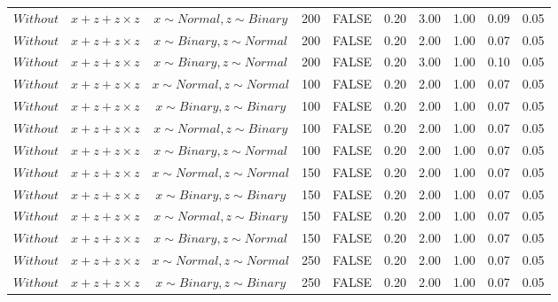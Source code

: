 \begin{longtable}{lccccccccc}
  $Without$ & $\textit{x} + \textit{z} + \textit{z} \times \textit{z}$ & $\textit{x} \sim Normal, \textit{z} \sim Binary$ & 200 & FALSE & 0.20 & 3.00 & 1.00 & 0.09 & 0.05 \\ 
  $Without$ & $\textit{x} + \textit{z} + \textit{z} \times \textit{z}$ & $\textit{x} \sim Binary, \textit{z} \sim Normal$ & 200 & FALSE & 0.20 & 2.00 & 1.00 & 0.07 & 0.05 \\ 
  $Without$ & $\textit{x} + \textit{z} + \textit{z} \times \textit{z}$ & $\textit{x} \sim Binary, \textit{z} \sim Normal$ & 200 & FALSE & 0.20 & 3.00 & 1.00 & 0.10 & 0.05 \\ 
  $Without$ & $\textit{x} + \textit{z} + \textit{z} \times \textit{z}$ & $\textit{x} \sim Normal , \textit{z} \sim Normal$ & 100 & FALSE & 0.20 & 2.00 & 1.00 & 0.07 & 0.05 \\ 
  $Without$ & $\textit{x} + \textit{z} + \textit{z} \times \textit{z}$ & $\textit{x} \sim Binary, \textit{z} \sim Binary$ & 100 & FALSE & 0.20 & 2.00 & 1.00 & 0.07 & 0.05 \\ 
  $Without$ & $\textit{x} + \textit{z} + \textit{z} \times \textit{z}$ & $\textit{x} \sim Normal, \textit{z} \sim Binary$ & 100 & FALSE & 0.20 & 2.00 & 1.00 & 0.07 & 0.05 \\ 
  $Without$ & $\textit{x} + \textit{z} + \textit{z} \times \textit{z}$ & $\textit{x} \sim Binary, \textit{z} \sim Normal$ & 100 & FALSE & 0.20 & 2.00 & 1.00 & 0.07 & 0.05 \\ 
  $Without$ & $\textit{x} + \textit{z} + \textit{z} \times \textit{z}$ & $\textit{x} \sim Normal , \textit{z} \sim Normal$ & 150 & FALSE & 0.20 & 2.00 & 1.00 & 0.07 & 0.05 \\ 
  $Without$ & $\textit{x} + \textit{z} + \textit{z} \times \textit{z}$ & $\textit{x} \sim Binary, \textit{z} \sim Binary$ & 150 & FALSE & 0.20 & 2.00 & 1.00 & 0.07 & 0.05 \\ 
  $Without$ & $\textit{x} + \textit{z} + \textit{z} \times \textit{z}$ & $\textit{x} \sim Normal, \textit{z} \sim Binary$ & 150 & FALSE & 0.20 & 2.00 & 1.00 & 0.07 & 0.05 \\ 
  $Without$ & $\textit{x} + \textit{z} + \textit{z} \times \textit{z}$ & $\textit{x} \sim Binary, \textit{z} \sim Normal$ & 150 & FALSE & 0.20 & 2.00 & 1.00 & 0.07 & 0.05 \\ 
  $Without$ & $\textit{x} + \textit{z} + \textit{z} \times \textit{z}$ & $\textit{x} \sim Normal , \textit{z} \sim Normal$ & 250 & FALSE & 0.20 & 2.00 & 1.00 & 0.07 & 0.05 \\ 
  $Without$ & $\textit{x} + \textit{z} + \textit{z} \times \textit{z}$ & $\textit{x} \sim Binary, \textit{z} \sim Binary$ & 250 & FALSE & 0.20 & 2.00 & 1.00 & 0.07 & 0.05 \\ 

\end{longtable}
